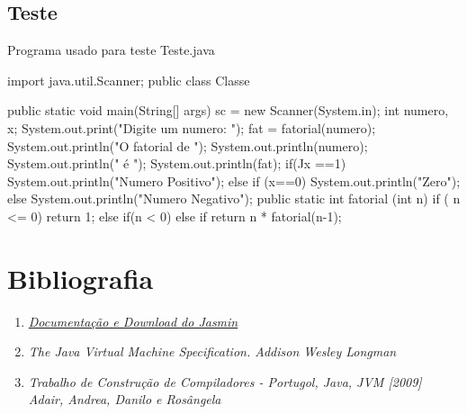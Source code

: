 \documentclass[12pt,a4paper,twoside]{report}
\begin{document}
\subsection{Teste}
Programa usado para teste
Teste.java
\begin{terminal}
import java.util.Scanner;
public class Classe
{
public static void main(String[] args)
{
sc = new Scanner(System.in);
int numero, x;
System.out.print("Digite um numero: ");
fat = fatorial(numero);
System.out.println("O fatorial de ");
System.out.println(numero);
System.out.println(" é ");
System.out.println(fat);
if(Jx ==1) System.out.println("Numero Positivo");
else if (x==0) System.out.println("Zero");
else System.out.println("Numero Negativo");
}
	public static int fatorial (int n){
if ( n <= 0) 
return 1;
else if(n < 0){} else if
return n * fatorial(n-1);
}



}
\end{terminal}



\clearpage
{}
\appendix
\section{Bibliografia}
	
    \begin{enumerate}
	

	\item \href {http://jasmin.sourceforge.net} {\textit   {Documentação e Download do Jasmin}}

	\item \textit {The Java Virtual Machine Specification. Addison Wesley Longman }
	
    
	\item \textit { Trabalho de Construção de Compiladores  -  Portugol, Java, JVM [2009] Adair, Andrea, Danilo e Rosângela}

	\end{enumerate}
\end{document}
